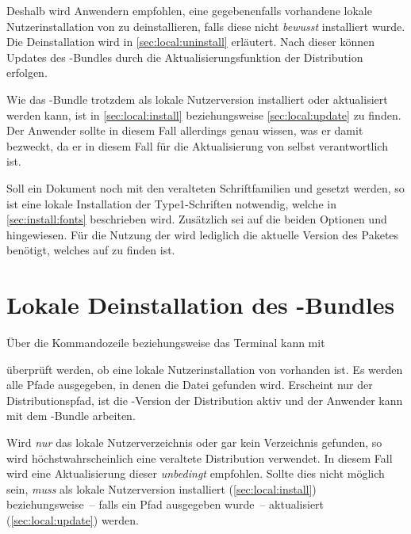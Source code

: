 Deshalb wird Anwendern empfohlen, eine gegebenenfalls vorhandene lokale 
Nutzerinstallation von \TUDScript zu deinstallieren, falls diese nicht 
\emph{bewusst} installiert wurde. Die Deinstallation wird in 
\autoref{sec:local:uninstall} erläutert. Nach dieser können Updates des 
\TUDScript-Bundles durch die Aktualisierungsfunktion der Distribution erfolgen. 

Wie das \TUDScript-Bundle trotzdem als lokale Nutzerversion installiert oder 
aktualisiert werden kann, ist in \autoref{sec:local:install} beziehungsweise 
\autoref{sec:local:update} zu finden. Der Anwender sollte in diesem Fall 
allerdings genau wissen, was er damit bezweckt, da er in diesem Fall für die 
Aktualisierung von \TUDScript selbst verantwortlich ist.

%
%
Soll ein Dokument noch mit den veralteten Schriftfamilien \Univers und \DIN 
gesetzt werden, so ist eine lokale Installation der Type1-Schriften notwendig, 
welche in \autoref{sec:install:fonts} beschrieben wird. Zusätzlich sei auf die 
beiden Optionen  und  hingewiesen. 
Für die Nutzung der \OpenSans wird lediglich die aktuelle Version des Paketes 
 benötigt, welches auf  zu finden ist.


\section{Lokale Deinstallation des \TUDScript-Bundles}
%
%
%
Über die Kommandozeile beziehungsweise das Terminal kann mit
%
\begin{quoting}
\end{quoting}
%
überprüft werden, ob eine lokale Nutzerinstallation von \TUDScript vorhanden 
ist. Es werden alle Pfade ausgegeben, in denen die Datei  
gefunden wird. Erscheint nur der Distributionspfad, ist die \TUDScript-Version 
der Distribution aktiv und der Anwender kann mit dem \TUDScript-Bundle arbeiten.

Wird \emph{nur} das lokale Nutzerverzeichnis oder gar kein Verzeichnis 
gefunden, so wird höchstwahrscheinlich eine veraltete Distribution 
verwendet. In diesem Fall wird eine Aktualisierung dieser \emph{unbedingt} 
empfohlen. Sollte dies nicht möglich sein, \emph{muss} \TUDScript als lokale 
Nutzerversion installiert (\autoref{sec:local:install}) beziehungsweise~-- 
falls ein Pfad ausgegeben wurde~-- aktualisiert (\autoref{sec:local:update}) 
werden.

